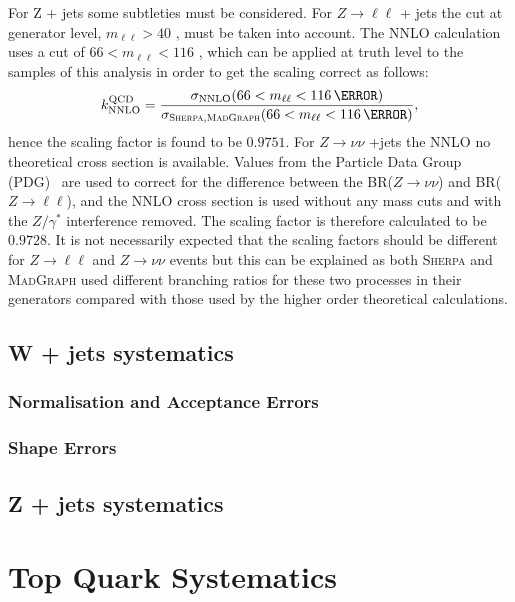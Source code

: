 For Z + jets some subtleties must be considered. For $Z \to \ell\ell$ + jets the
cut at generator level, $m_{\ell\ell}>40$ \GeV, must be taken into account. The
NNLO calculation uses a cut of $66<m_{\ell\ell}<116$ \GeV, which can be applied
at truth level to the samples of this analysis in order to get the scaling
correct as follows:
\begin{equation}
  k_{\text{NNLO}}^{\text{QCD}} = \frac{\sigma_{\text{NNLO}}(66<m_{\ell\ell}<116\,{\GeV})}{\sigma_{\textsc{Sherpa},\textsc{MadGraph}}(66<m_{\ell\ell}<116\,{\GeV})},
  \label{eq:nnlo-vjets-k}
\end{equation}
hence the scaling factor is found to be $0.9751$. For $Z \to \nu\nu$ +jets the
NNLO no theoretical cross section is available. Values from the
Particle Data Group (PDG)~\cite{PDG} are used to correct for the difference
between the BR($Z \to \nu\nu$) and BR($Z \to \ell\ell$), and the NNLO cross
section is used without any mass cuts and with the $Z/\gamma^*$ interference
removed. The scaling factor is therefore calculated to be $0.9728$. It is not
necessarily expected that the scaling factors should be different for $Z \to
\ell \ell$ and $Z \to \nu \nu$ events but this can be explained as both
\textsc{Sherpa} and \textsc{MadGraph} used different branching ratios for these
two processes in their generators compared with those used by the higher order
theoretical calculations.

\subsection{W + jets systematics}


\subsubsection{Normalisation and Acceptance Errors}

\subsubsection{Shape Errors}

\subsection{Z + jets systematics}



\section{Top Quark Systematics}


